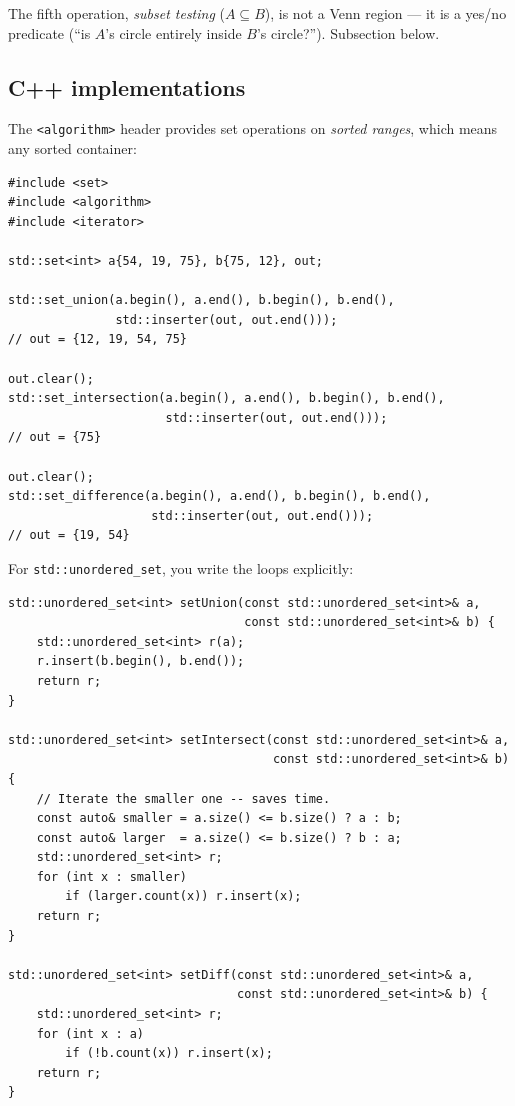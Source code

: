 \documentclass[11pt]{article}
\begin{document}
The fifth operation, \emph{subset testing} ($A \subseteq B$), is not
a Venn region --- it is a yes/no predicate (``is $A$'s circle
entirely inside $B$'s circle?''). Subsection below.

\subsection*{C++ implementations}

The \texttt{<algorithm>} header provides set operations on \emph{sorted ranges}, which means any sorted container:

\begin{lstlisting}[basicstyle=\ttfamily\small,frame=single]
#include <set>
#include <algorithm>
#include <iterator>

std::set<int> a{54, 19, 75}, b{75, 12}, out;

std::set_union(a.begin(), a.end(), b.begin(), b.end(),
               std::inserter(out, out.end()));
// out = {12, 19, 54, 75}

out.clear();
std::set_intersection(a.begin(), a.end(), b.begin(), b.end(),
                      std::inserter(out, out.end()));
// out = {75}

out.clear();
std::set_difference(a.begin(), a.end(), b.begin(), b.end(),
                    std::inserter(out, out.end()));
// out = {19, 54}
\end{lstlisting}

For \texttt{std::unordered\_set}, you write the loops explicitly:

\begin{lstlisting}[basicstyle=\ttfamily\small,frame=single]
std::unordered_set<int> setUnion(const std::unordered_set<int>& a,
                                 const std::unordered_set<int>& b) {
    std::unordered_set<int> r(a);
    r.insert(b.begin(), b.end());
    return r;
}

std::unordered_set<int> setIntersect(const std::unordered_set<int>& a,
                                     const std::unordered_set<int>& b) {
    // Iterate the smaller one -- saves time.
    const auto& smaller = a.size() <= b.size() ? a : b;
    const auto& larger  = a.size() <= b.size() ? b : a;
    std::unordered_set<int> r;
    for (int x : smaller)
        if (larger.count(x)) r.insert(x);
    return r;
}

std::unordered_set<int> setDiff(const std::unordered_set<int>& a,
                                const std::unordered_set<int>& b) {
    std::unordered_set<int> r;
    for (int x : a)
        if (!b.count(x)) r.insert(x);
    return r;
}
\end{lstlisting}
\end{document}
